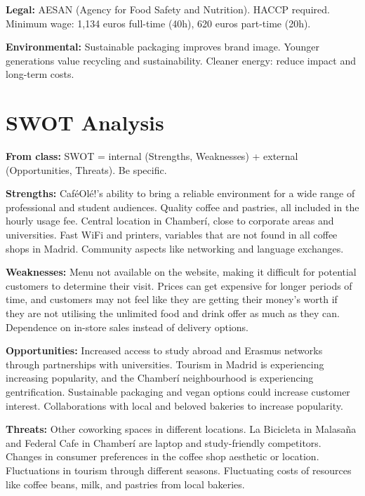 \documentclass[12pt,a4paper]{article}
\begin{document}
\textbf{\textcolor{cafebrown}{Legal:}} AESAN (Agency for Food Safety and Nutrition). HACCP required. Minimum wage: 1,134 euros full-time (40h), 620 euros part-time (20h).

\textbf{\textcolor{cafebrown}{Environmental:}} Sustainable packaging improves brand image. Younger generations value recycling and sustainability. Cleaner energy: reduce impact and long-term costs.

\vspace{0.5em}
\noindent{\color{sectionblue}\rule{\textwidth}{0.4pt}}

\section*{\color{sectionblue}SWOT Analysis}\label{sec:swot}

\textbf{From class:} SWOT = internal (Strengths, Weaknesses) + external (Opportunities, Threats). Be specific.

\textbf{\textcolor{cafebrown}{Strengths:}} Caf\'eOl\'e!'s ability to bring a reliable environment for a wide range of professional and student audiences. Quality coffee and pastries, all included in the hourly usage fee. Central location in Chamber\'i, close to corporate areas and universities. Fast WiFi and printers, variables that are not found in all coffee shops in Madrid. Community aspects like networking and language exchanges.

\textbf{\textcolor{cafebrown}{Weaknesses:}} Menu not available on the website, making it difficult for potential customers to determine their visit. Prices can get expensive for longer periods of time, and customers may not feel like they are getting their money's worth if they are not utilising the unlimited food and drink offer as much as they can. Dependence on in-store sales instead of delivery options.

\textbf{\textcolor{cafebrown}{Opportunities:}} Increased access to study abroad and Erasmus networks through partnerships with universities. Tourism in Madrid is experiencing increasing popularity, and the Chamber\'i neighbourhood is experiencing gentrification. Sustainable packaging and vegan options could increase customer interest. Collaborations with local and beloved bakeries to increase popularity.

\textbf{\textcolor{cafebrown}{Threats:}} Other coworking spaces in different locations. La Bicicleta in Malasa\~na and Federal Cafe in Chamber\'i are laptop and study-friendly competitors. Changes in consumer preferences in the coffee shop aesthetic or location. Fluctuations in tourism through different seasons. Fluctuating costs of resources like coffee beans, milk, and pastries from local bakeries.
\end{document}
